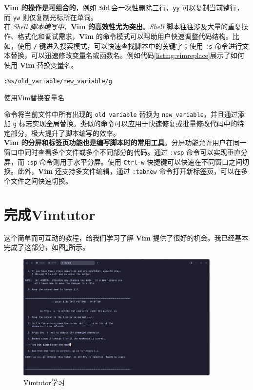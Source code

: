 \textbf{Vim 的操作是可组合的}，例如 \texttt{3dd} 会一次性删除三行，\texttt{yy} 可以复制当前整行，而 \texttt{yw} 则仅复制光标所在单词。\\

在 \textit{Shell 脚本编写中}，\textbf{Vim 的高效性尤为突出}。\textit{Shell} 脚本往往涉及大量的重复操作、格式化和调试需求，\textbf{Vim} 的命令模式可以帮助用户快速调整代码结构。比如，使用 \texttt{/} 键进入搜索模式，可以快速查找脚本中的关键字；使用 \texttt{:s} 命令进行文本替换，可以迅速修改变量名或函数名。例如代码\ref{listing:vimreplace}展示了如何使用 \textbf{Vim} 替换变量名。

\begin{longlisting}
    \begin{verbatim}
:%s/old_variable/new_variable/g
    \end{verbatim}
    \caption{使用Vim替换变量名}
    \label{listing:vimreplace}
\end{longlisting}

命令将当前文件中所有出现的 \texttt{old\_variable} 替换为 \texttt{new\_variable}，并且通过添加 \texttt{g} 标志实现全局替换。类似的命令可以应用于快速修复或批量修改代码中的特定部分，极大提升了脚本编写的效率。\\

\textbf{Vim 的分屏和标签页功能也是编写脚本时的常用工具}。分屏功能允许用户在同一窗口中同时查看多个文件或多个不同部分的代码。通过 \texttt{:vsp} 命令可以实现垂直分屏，而 \texttt{:sp} 命令则用于水平分屏。使用 \texttt{Ctrl-w} 快捷键可以快速在不同窗口之间切换。此外，\textbf{Vim} 还支持多文件编辑，通过 \texttt{:tabnew} 命令打开新标签页，可以在多个文件之间快速切换。

\section{完成Vimtutor}

这个简单而可互动的教程，给我们学习了解 \textbf{Vim} 提供了很好的机会。我已经基本完成了这部分，如图\ref{fig:vimtutor}所示。\\

\begin{figure}[htbp]
    \centering
    \includegraphics[width=0.9\textwidth]{Figures/vimtutor.png}
    \caption{Vimtutor学习}
    \label{fig:vimtutor}
\end{figure}